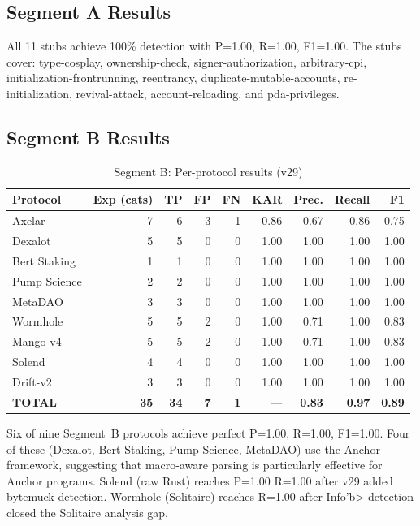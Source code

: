 \documentclass[conference]{IEEEtran}
\begin{document}
\subsection{Segment A Results}

All 11 stubs achieve 100\% detection with P=1.00, R=1.00, F1=1.00. The stubs cover: type-cosplay, ownership-check, signer-authorization, arbitrary-cpi, initialization-frontrunning, reentrancy, duplicate-mutable-accounts, re-initialization, revival-attack, account-reloading, and pda-privileges.

\subsection{Segment B Results}

\begin{table}[htbp]
  \caption{Segment B: Per-protocol results (v29)}
  \label{tab:seg_b}
  \centering
  \begin{tabular}{lrrrrrrrr}
    \hline
    Protocol & Exp (cats) & TP & FP & FN & KAR & Prec. & Recall & F1 \\
    \hline
    Axelar & 7 & 6 & 3 & 1 & 0.86 & 0.67 & 0.86 & 0.75 \\
    Dexalot & 5 & 5 & 0 & 0 & 1.00 & 1.00 & 1.00 & 1.00 \\
    Bert Staking & 1 & 1 & 0 & 0 & 1.00 & 1.00 & 1.00 & 1.00 \\
    Pump Science & 2 & 2 & 0 & 0 & 1.00 & 1.00 & 1.00 & 1.00 \\
    MetaDAO & 3 & 3 & 0 & 0 & 1.00 & 1.00 & 1.00 & 1.00 \\
    Wormhole & 5 & 5 & 2 & 0 & 1.00 & 0.71 & 1.00 & 0.83 \\
    Mango-v4 & 5 & 5 & 2 & 0 & 1.00 & 0.71 & 1.00 & 0.83 \\
    Solend & 4 & 4 & 0 & 0 & 1.00 & 1.00 & 1.00 & 1.00 \\
    Drift-v2 & 3 & 3 & 0 & 0 & 1.00 & 1.00 & 1.00 & 1.00 \\
    \hline
    {\bf TOTAL} & {\bf 35} & {\bf 34} & {\bf 7} & {\bf 1} & --- & {\bf 0.83} & {\bf 0.97} & {\bf 0.89} \\
    \hline
  \end{tabular}
\end{table}

Six of nine Segment~B protocols achieve perfect P=1.00, R=1.00, F1=1.00. Four of these (Dexalot, Bert Staking, Pump Science, MetaDAO) use the Anchor framework, suggesting that macro-aware parsing is particularly effective for Anchor programs. Solend (raw Rust) reaches P=1.00 R=1.00 after v29 added bytemuck detection. Wormhole (Solitaire) reaches R=1.00 after Info'{}b> detection closed the Solitaire analysis gap.
\end{document}
